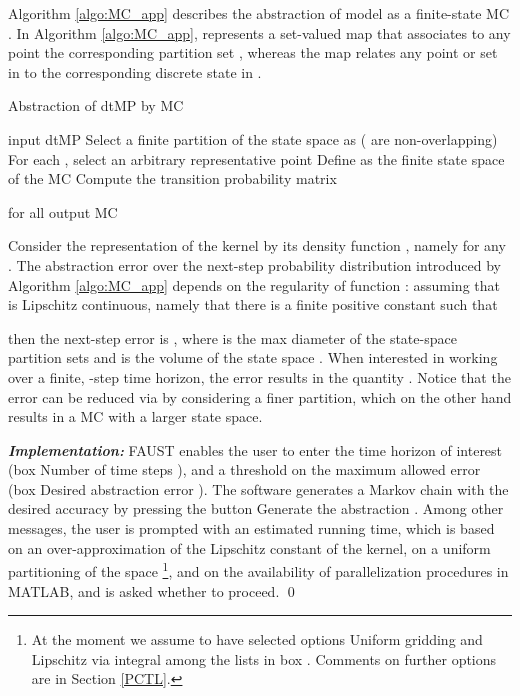 \documentclass{llncs}
\newcommand*\circled[1]{\tikz[baseline=(char.base)]{\node[shape=circle,draw,inner sep=0.5pt] (char) {#1};}}
\newcommand{\software}{\textsf{FAUST}\xspace}
\newcommand{\boxname}[1]{\textsf{#1}}
\begin{document}
Algorithm \ref{algo:MC_app} describes the abstraction of model  as a finite-state MC  \cite{APKL10}.  
In Algorithm \ref{algo:MC_app}, 
 represents a set-valued map that associates to any point  the corresponding partition set , 
whereas the map  relates any point  or set in  to 
the corresponding discrete state in .
\vspace{-0.2in}
\begin{algorithm}[h]
\caption{Abstraction of dtMP  by  MC }
\label{algo:MC_app}
\begin{center}
\begin{algorithmic}[1]
\REQUIRE 
input dtMP 
\STATE
Select a finite
partition of the state space  as   
( are non-overlapping)
\STATE
For each , select an arbitrary representative point  
\STATE
Define 
 as the finite state space of the MC 
\STATE
Compute the transition probability matrix

for all 
\ENSURE
output MC 
\vspace{-0.1in}
\end{algorithmic}
\end{center}
\end{algorithm}

Consider the representation of the kernel  by its density function , 
namely  for any .
The abstraction error over the next-step probability distribution introduced by Algorithm \ref{algo:MC_app} depends on the regularity of function : 
assuming that  is Lipschitz continuous, namely that there is a finite positive constant  such that

then the next-step error is , 
where  is the max diameter of the state-space partition sets and  is the volume of the state space \cite{APKL10}. 
When interested in working over a finite, -step time horizon, the error results in the quantity . 
Notice that the error can be reduced via  by considering a finer partition, 
which on the other hand results in a MC  with a larger state space. 

\textit{\textbf{Implementation: }}
\software enables the user to enter the time horizon  of interest (box \boxname{Number of time steps} \circled{5}), 
and a threshold on the maximum allowed error (box \boxname{Desired abstraction error} \circled{5}). 
The software generates a Markov chain with the desired accuracy by pressing the button \boxname{Generate the abstraction} \circled{6}.
Among other messages, 
the user is prompted with an estimated running time, 
which is based on an over-approximation of the Lipschitz constant of the kernel, 
on a uniform partitioning of the space  \footnote{ 
At the moment we assume to have selected options \boxname{Uniform gridding} and \boxname{Lipschitz via integral} among the lists in box \circled{4}. 
Comments on further options are in Section \ref{PCTL}. 
}, 
and on the availability of parallelization procedures in MATLAB, 
and is asked whether to proceed.
\qed 
\end{document}
